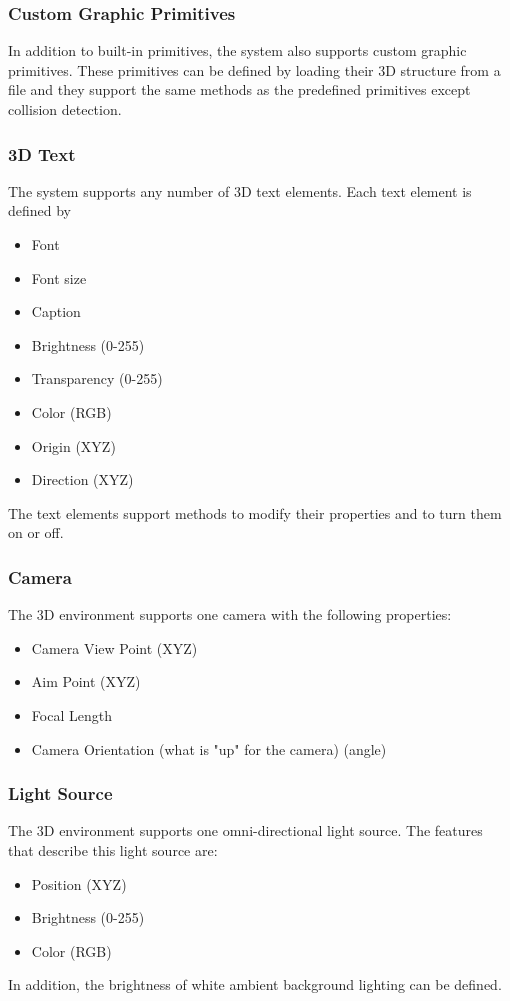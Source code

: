 \documentclass[letterpaper,oneside,12pt]{article}
\begin{document}
\subsubsection{Custom Graphic Primitives}

In addition to built-in primitives, the system also supports custom graphic 
primitives. These primitives can be defined by loading their 3D structure from a 
file and they support the same methods as the predefined primitives except 
collision detection.


\subsubsection{3D Text}

The system supports any number of 3D text elements. Each text element
is defined by
\begin{itemize}
 \item Font
 \item Font size
 \item Caption
 \item Brightness (0-255)
 \item Transparency (0-255)
 \item Color (RGB)
 \item Origin (XYZ)
 \item Direction (XYZ)
\end{itemize}

The text elements support methods to modify their properties and to turn
them on or off.


\subsubsection{Camera}
The 3D environment supports one camera with the following properties:
\begin{itemize}
 \item Camera View Point (XYZ)
 \item Aim Point (XYZ)
 \item Focal Length
 \item Camera Orientation (what is "up" for the camera) (angle)
\end{itemize}


\subsubsection{Light Source}
The 3D environment supports one omni-directional light source. The features that 
describe this light source are:
\begin{itemize}
 \item Position (XYZ)
 \item Brightness (0-255)
 \item Color (RGB)
\end{itemize}
In addition, the brightness of white ambient background lighting can be defined.
\end{document}
